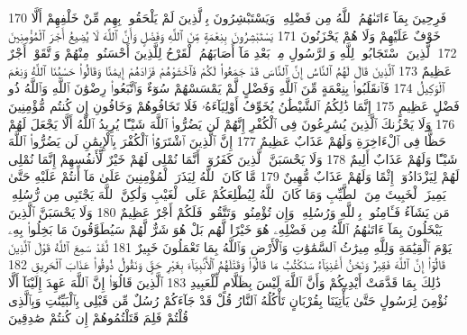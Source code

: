 {\tiny\colorbox{cl_aya}{170}} فَرِحِينَ بِمَآ ءَاتَىٰهُمُ ٱللَّهُ مِن فَضْلِهِۦ وَيَسْتَبْشِرُونَ بِٱلَّذِينَ لَمْ يَلْحَقُوا۟ بِهِم مِّنْ خَلْفِهِمْ أَلَّا خَوْفٌ عَلَيْهِمْ وَلَا هُمْ يَحْزَنُونَ
{\tiny\colorbox{cl_aya}{171}} يَسْتَبْشِرُونَ بِنِعْمَةٍ مِّنَ ٱللَّهِ وَفَضْلٍ وَأَنَّ ٱللَّهَ لَا يُضِيعُ أَجْرَ ٱلْمُؤْمِنِينَ
{\tiny\colorbox{cl_aya}{172}} ٱلَّذِينَ ٱسْتَجَابُوا۟ لِلَّهِ وَٱلرَّسُولِ مِنۢ بَعْدِ مَآ أَصَابَهُمُ ٱلْقَرْحُ لِلَّذِينَ أَحْسَنُوا۟ مِنْهُمْ وَٱتَّقَوْا۟ أَجْرٌ عَظِيمٌ
{\tiny\colorbox{cl_aya}{173}} ٱلَّذِينَ قَالَ لَهُمُ ٱلنَّاسُ إِنَّ ٱلنَّاسَ قَدْ جَمَعُوا۟ لَكُمْ فَٱخْشَوْهُمْ فَزَادَهُمْ إِيمَٰنًا وَقَالُوا۟ حَسْبُنَا ٱللَّهُ وَنِعْمَ ٱلْوَكِيلُ
{\tiny\colorbox{cl_aya}{174}} فَٱنقَلَبُوا۟ بِنِعْمَةٍ مِّنَ ٱللَّهِ وَفَضْلٍ لَّمْ يَمْسَسْهُمْ سُوٓءٌ وَٱتَّبَعُوا۟ رِضْوَٰنَ ٱللَّهِ وَٱللَّهُ ذُو فَضْلٍ عَظِيمٍ
{\tiny\colorbox{cl_aya}{175}} إِنَّمَا ذَٰلِكُمُ ٱلشَّيْطَٰنُ يُخَوِّفُ أَوْلِيَآءَهُۥ فَلَا تَخَافُوهُمْ وَخَافُونِ إِن كُنتُم مُّؤْمِنِينَ
{\tiny\colorbox{cl_aya}{176}} وَلَا يَحْزُنكَ ٱلَّذِينَ يُسَٰرِعُونَ فِى ٱلْكُفْرِ إِنَّهُمْ لَن يَضُرُّوا۟ ٱللَّهَ شَيْـًٔا يُرِيدُ ٱللَّهُ أَلَّا يَجْعَلَ لَهُمْ حَظًّا فِى ٱلْءَاخِرَةِ وَلَهُمْ عَذَابٌ عَظِيمٌ
{\tiny\colorbox{cl_aya}{177}} إِنَّ ٱلَّذِينَ ٱشْتَرَوُا۟ ٱلْكُفْرَ بِٱلْإِيمَٰنِ لَن يَضُرُّوا۟ ٱللَّهَ شَيْـًٔا وَلَهُمْ عَذَابٌ أَلِيمٌ
{\tiny\colorbox{cl_aya}{178}} وَلَا يَحْسَبَنَّ ٱلَّذِينَ كَفَرُوٓا۟ أَنَّمَا نُمْلِى لَهُمْ خَيْرٌ لِّأَنفُسِهِمْ إِنَّمَا نُمْلِى لَهُمْ لِيَزْدَادُوٓا۟ إِثْمًا وَلَهُمْ عَذَابٌ مُّهِينٌ
{\tiny\colorbox{cl_aya}{179}} مَّا كَانَ ٱللَّهُ لِيَذَرَ ٱلْمُؤْمِنِينَ عَلَىٰ مَآ أَنتُمْ عَلَيْهِ حَتَّىٰ يَمِيزَ ٱلْخَبِيثَ مِنَ ٱلطَّيِّبِ وَمَا كَانَ ٱللَّهُ لِيُطْلِعَكُمْ عَلَى ٱلْغَيْبِ وَلَٰكِنَّ ٱللَّهَ يَجْتَبِى مِن رُّسُلِهِۦ مَن يَشَآءُ فَـَٔامِنُوا۟ بِٱللَّهِ وَرُسُلِهِۦ وَإِن تُؤْمِنُوا۟ وَتَتَّقُوا۟ فَلَكُمْ أَجْرٌ عَظِيمٌ
{\tiny\colorbox{cl_aya}{180}} وَلَا يَحْسَبَنَّ ٱلَّذِينَ يَبْخَلُونَ بِمَآ ءَاتَىٰهُمُ ٱللَّهُ مِن فَضْلِهِۦ هُوَ خَيْرًا لَّهُم بَلْ هُوَ شَرٌّ لَّهُمْ سَيُطَوَّقُونَ مَا بَخِلُوا۟ بِهِۦ يَوْمَ ٱلْقِيَٰمَةِ وَلِلَّهِ مِيرَٰثُ ٱلسَّمَٰوَٰتِ وَٱلْأَرْضِ وَٱللَّهُ بِمَا تَعْمَلُونَ خَبِيرٌ
{\tiny\colorbox{cl_aya}{181}} لَّقَدْ سَمِعَ ٱللَّهُ قَوْلَ ٱلَّذِينَ قَالُوٓا۟ إِنَّ ٱللَّهَ فَقِيرٌ وَنَحْنُ أَغْنِيَآءُ سَنَكْتُبُ مَا قَالُوا۟ وَقَتْلَهُمُ ٱلْأَنۢبِيَآءَ بِغَيْرِ حَقٍّ وَنَقُولُ ذُوقُوا۟ عَذَابَ ٱلْحَرِيقِ
{\tiny\colorbox{cl_aya}{182}} ذَٰلِكَ بِمَا قَدَّمَتْ أَيْدِيكُمْ وَأَنَّ ٱللَّهَ لَيْسَ بِظَلَّامٍ لِّلْعَبِيدِ
{\tiny\colorbox{cl_aya}{183}} ٱلَّذِينَ قَالُوٓا۟ إِنَّ ٱللَّهَ عَهِدَ إِلَيْنَآ أَلَّا نُؤْمِنَ لِرَسُولٍ حَتَّىٰ يَأْتِيَنَا بِقُرْبَانٍ تَأْكُلُهُ ٱلنَّارُ قُلْ قَدْ جَآءَكُمْ رُسُلٌ مِّن قَبْلِى بِٱلْبَيِّنَٰتِ وَبِٱلَّذِى قُلْتُمْ فَلِمَ قَتَلْتُمُوهُمْ إِن كُنتُمْ صَٰدِقِينَ
